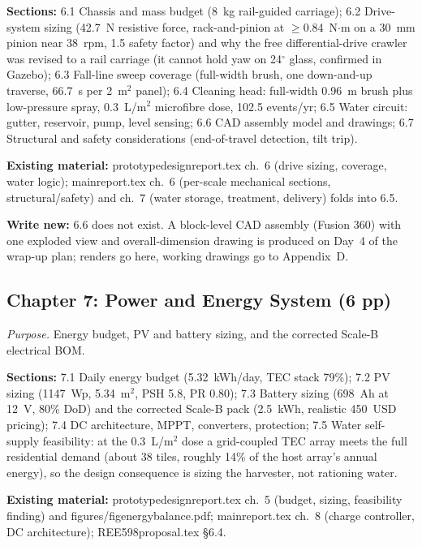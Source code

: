 \documentclass[11pt,a4paper]{article}
\newcommand{\f}[1]{{\ttfamily\def\_{\textunderscore\allowbreak}#1}}
\begin{document}
\textbf{Sections:} 6.1 Chassis and mass budget (8~kg rail-guided carriage); 6.2
Drive-system sizing (42.7~N resistive force, rack-and-pinion at $\geq$0.84~N$\cdot$m
on a 30~mm pinion near 38~rpm, 1.5 safety factor) and why the free
differential-drive crawler was revised to a rail carriage (it cannot hold yaw on
24$^\circ$ glass, confirmed in Gazebo); 6.3 Fall-line sweep coverage (full-width
brush, one down-and-up traverse, 66.7~s per 2~m$^2$ panel); 6.4 Cleaning
head: full-width 0.96~m brush plus low-pressure spray, 0.3~L/m$^2$ microfibre dose,
102.5 events/yr; 6.5 Water circuit: gutter, reservoir, pump, level sensing; 6.6 CAD
assembly model and drawings; 6.7 Structural and safety considerations (end-of-travel
detection, tilt trip).

\textbf{Existing material:} \f{prototype\_design\_report.tex} ch.~6 (drive
sizing, coverage, water logic); \f{main\_report.tex} ch.~6 (per-scale
mechanical sections, structural/safety) and ch.~7 (water storage, treatment,
delivery) folds into 6.5.

\textbf{Write new:} 6.6 does not exist. A block-level CAD assembly (Fusion 360)
with one exploded view and overall-dimension drawing is produced on Day~4 of
the wrap-up plan; renders go here, working drawings go to Appendix~D.

\subsection{Chapter 7: Power and Energy System (6 pp)}
\textit{Purpose.} Energy budget, PV and battery sizing, and the corrected
Scale-B electrical BOM.

\textbf{Sections:} 7.1 Daily energy budget (5.32~kWh/day, TEC stack 79\%);
7.2 PV sizing (1147~Wp, 5.34~m$^2$, PSH 5.8, PR 0.80); 7.3 Battery sizing
(698~Ah at 12~V, 80\% DoD) and the corrected Scale-B pack (2.5~kWh, realistic
450~USD pricing); 7.4 DC architecture, MPPT, converters, protection; 7.5 Water
self-supply feasibility: at the 0.3~L/m$^2$ dose a grid-coupled TEC array meets the
full residential demand (about 38 tiles, roughly 14\% of the host array's annual
energy), so the design consequence is sizing the harvester, not rationing water.

\textbf{Existing material:} \f{prototype\_design\_report.tex} ch.~5 (budget,
sizing, feasibility finding) and \f{figures/fig\_energy\_balance.pdf};
\f{main\_report.tex} ch.~8 (charge controller, DC architecture);
\f{REE598\_proposal.tex} \S6.4.
\end{document}
